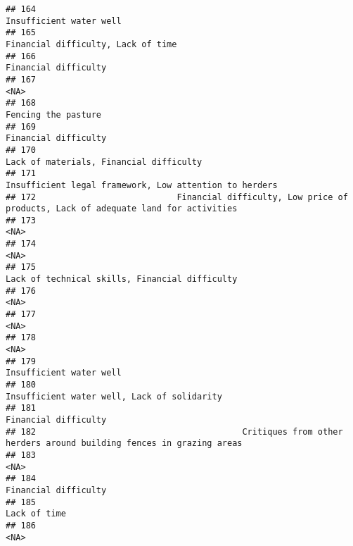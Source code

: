 \documentclass[
]{article}
\begin{document}
\begin{verbatim}
## 164                                                                                      Insufficient water well
## 165                                                                           Financial difficulty, Lack of time
## 166                                                                                         Financial difficulty
## 167                                                                                                         <NA>
## 168                                                                                          Fencing the pasture
## 169                                                                                         Financial difficulty
## 170                                                                      Lack of materials, Financial difficulty
## 171                                                       Insufficient legal framework, Low attention to herders
## 172                            Financial difficulty, Low price of products, Lack of adequate land for activities
## 173                                                                                                         <NA>
## 174                                                                                                         <NA>
## 175                                                               Lack of technical skills, Financial difficulty
## 176                                                                                                         <NA>
## 177                                                                                                         <NA>
## 178                                                                                                         <NA>
## 179                                                                                      Insufficient water well
## 180                                                                  Insufficient water well, Lack of solidarity
## 181                                                                                         Financial difficulty
## 182                                         Critiques from other herders around building fences in grazing areas
## 183                                                                                                         <NA>
## 184                                                                                         Financial difficulty
## 185                                                                                                 Lack of time
## 186                                                                                                         <NA>

\end{verbatim}
\end{document}
